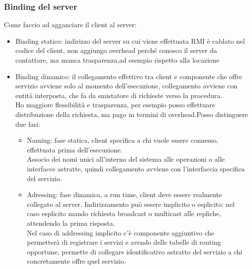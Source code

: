 \documentclass{article}
\begin{document}
\subsubsection{Binding del server}
Come faccio ad agganciare il client al server:
\begin{itemize}
\item Binding statico: indirizzo del server su cui viene effettuata RMI è cablato nel codice del client, non aggiungo overhead perché conosco il server da contattare, ma manca trasparenza,ad esempio rispetto alla locazione
\item Binding dinamico: il collegamento effettivo tra client e componente che offre servizio avviene solo al momento dell'esecuzione, collegamento avviene con entità interposta, che fa da smistatore di richieste verso la procedura.\\ Ho maggiore flessibilità e trasparenza, per esempio posso effettuare distribuzione della richiesta, ma pago in termini di overhead.Posso distinguere due fasi:
\begin{itemize}
\item Naming: fase statica, client specifica a chi vuole essere connesso, effettuata prima dell'esecuzione.\\ Associo dei nomi unici all'interno del sistema alle operazioni o alle interfacce astratte, quindi collegamento avviene con l'interfaccia specifica del servizio.
\item Adressing: fase dinamica, a run time, client deve essere realmente collegato al server. Indirizzamento può essere implicito o esplicito: nel caso esplicito mando richiesta broadcast o multicast alle repliche, attendendo la prima risposta.\\ Nel caso di addressing implicito c'è componente aggiuntivo che permetterà di registrare i servizi e avendo delle tabelle di routing opportune, permette di collegare identificativo astratto del servizio a chi concretamente offre quel servizio.
\end{itemize}
\end{itemize}
\end{document}
